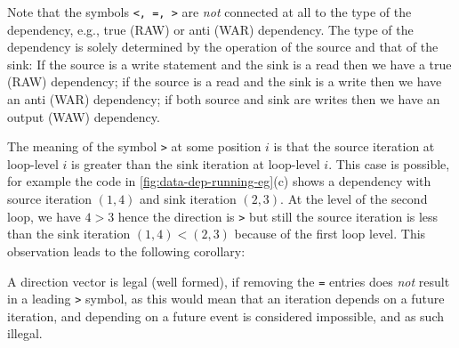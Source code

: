 Note that the symbols \texttt{<, =, >} are \emph{not} connected at all
to the type of the dependency, e.g., true (RAW) or anti (WAR)
dependency.  The type of the dependency is solely determined by the
operation of the source and that of the sink: If the source is a write
statement and the sink is a read then we have a true (RAW) dependency;
if the source is a read and the sink is a write then we have an anti
(WAR) dependency; if both source and sink are writes then we have an
output (WAW) dependency.

The meaning of the symbol \texttt{>} at some position $i$ is that
the source iteration at loop-level $i$ is greater than the sink
iteration at loop-level $i$. This case is possible, for example
the code in \cref{fig:data-dep-running-eg}(c) shows a dependency
with source iteration $(1,4)$ and sink iteration $(2,3)$. At the
level of the second loop, we have $4 > 3$ hence the direction
is \texttt{>} but still the source iteration is less than the sink
iteration $(1,4) < (2,3)$ because of the first loop level.
This observation leads to the following corollary:

\begin{corollary}\label{Leg-Dir-Vect}

  A direction vector is legal (well formed), if removing the
  \texttt{=} entries does \emph{not} result in a leading \texttt{>}
  symbol, as this would mean that an iteration depends on a future
  iteration, and depending on a future event is considered impossible,
  and as such illegal.
\end{corollary}

